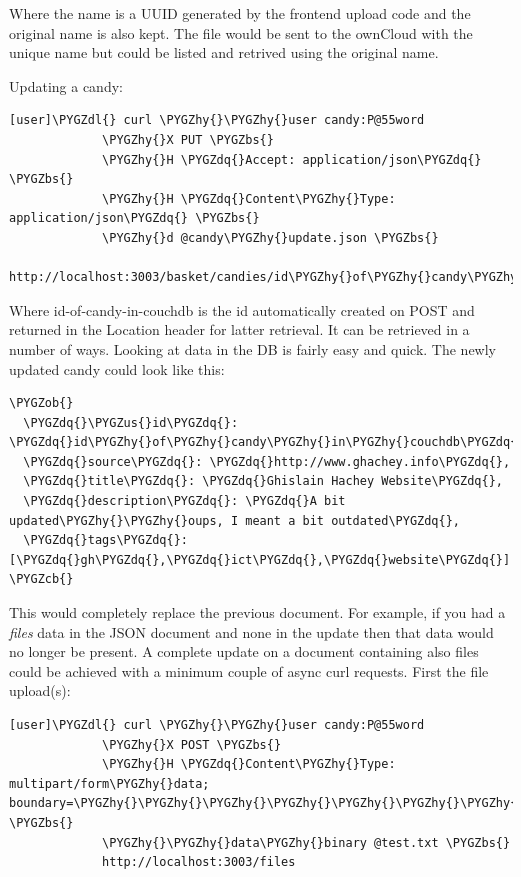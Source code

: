 \documentclass[letterpaper,10pt,english]{sphinxmanual}
\def\PYGZbs{\char`\\}
\def\PYGZus{\char`\_}
\def\PYGZob{\char`\{}
\def\PYGZcb{\char`\}}
\def\PYGZdl{\char`\$}
\def\PYGZhy{\char`\-}
\def\PYGZdq{\char`\"}
\begin{document}
Where the name is a UUID generated by the frontend upload code and the
original name is also kept. The file would be sent to the ownCloud
with the unique name but could be listed and retrived using the
original name.

Updating a candy:

\begin{Verbatim}[commandchars=\\\{\}]
[user]\PYGZdl{} curl \PYGZhy{}\PYGZhy{}user candy:P@55word
             \PYGZhy{}X PUT \PYGZbs{}
             \PYGZhy{}H \PYGZdq{}Accept: application/json\PYGZdq{}  \PYGZbs{}
             \PYGZhy{}H \PYGZdq{}Content\PYGZhy{}Type: application/json\PYGZdq{} \PYGZbs{}
             \PYGZhy{}d @candy\PYGZhy{}update.json \PYGZbs{}
             http://localhost:3003/basket/candies/id\PYGZhy{}of\PYGZhy{}candy\PYGZhy{}in\PYGZhy{}couchdb
\end{Verbatim}

Where id-of-candy-in-couchdb is the id automatically created on POST
and returned in the Location header for latter retrieval. It can be
retrieved in a number of ways. Looking at data in the DB is fairly
easy and quick. The newly updated candy could look like this:

\begin{Verbatim}[commandchars=\\\{\}]
\PYGZob{}
  \PYGZdq{}\PYGZus{}id\PYGZdq{}: \PYGZdq{}id\PYGZhy{}of\PYGZhy{}candy\PYGZhy{}in\PYGZhy{}couchdb\PYGZdq{}
  \PYGZdq{}source\PYGZdq{}: \PYGZdq{}http://www.ghachey.info\PYGZdq{},
  \PYGZdq{}title\PYGZdq{}: \PYGZdq{}Ghislain Hachey Website\PYGZdq{},
  \PYGZdq{}description\PYGZdq{}: \PYGZdq{}A bit updated\PYGZhy{}\PYGZhy{}oups, I meant a bit outdated\PYGZdq{},
  \PYGZdq{}tags\PYGZdq{}: [\PYGZdq{}gh\PYGZdq{},\PYGZdq{}ict\PYGZdq{},\PYGZdq{}website\PYGZdq{}]
\PYGZcb{}
\end{Verbatim}

This would completely replace the previous document. For example, if
you had a \emph{files} data in the JSON document and none in the update
then that data would no longer be present. A complete update on a
document containing also files could be achieved with a minimum couple
of async curl requests. First the file upload(s):

\begin{Verbatim}[commandchars=\\\{\}]
[user]\PYGZdl{} curl \PYGZhy{}\PYGZhy{}user candy:P@55word
             \PYGZhy{}X POST \PYGZbs{}
             \PYGZhy{}H \PYGZdq{}Content\PYGZhy{}Type: multipart/form\PYGZhy{}data; boundary=\PYGZhy{}\PYGZhy{}\PYGZhy{}\PYGZhy{}\PYGZhy{}\PYGZhy{}\PYGZhy{}\PYGZhy{}\PYGZhy{}\PYGZhy{}\PYGZhy{}\PYGZhy{}\PYGZhy{}\PYGZhy{}\PYGZhy{}\PYGZhy{}\PYGZhy{}\PYGZhy{}\PYGZhy{}\PYGZhy{}\PYGZhy{}\PYGZhy{}\PYGZhy{}\PYGZhy{}\PYGZhy{}\PYGZhy{}\PYGZhy{}11936647625814307171179269292\PYGZdq{} \PYGZbs{}
             \PYGZhy{}\PYGZhy{}data\PYGZhy{}binary @test.txt \PYGZbs{}
             http://localhost:3003/files
\end{Verbatim}
\end{document}
